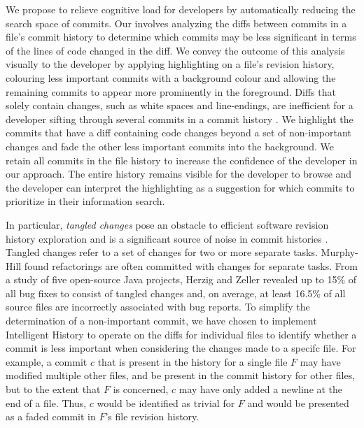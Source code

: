 We propose  to relieve cognitive load for developers by automatically reducing the search space of commits.
Our  involves analyzing the diffs between commits in a file's commit history to determine which commits may be less significant in terms of the lines of code changed in the diff.
We convey the outcome of this analysis visually to the developer by applying highlighting on a file's revision history, 
colouring less important commits with a background colour and allowing the remaining commits to appear more prominently in the foreground.
Diffs that solely contain changes, such as white spaces and line-endings, are inefficient for a developer sifting through several commits in a commit history \cite{codoban_software_2015}.
We highlight the commits that have a diff containing code changes beyond a set of non-important changes and fade the other less important commits into the background.
We retain all commits in the file history to increase the confidence of the developer in our approach.
The entire history remains visible for the developer to browse 
and the developer can interpret the highlighting as a suggestion for which commits to prioritize in their information search.

In particular, \emph{tangled changes} pose an obstacle to efficient software revision history exploration 
and is a significant source of noise in commit histories \cite{herzig_tangled_2013}.
Tangled changes refer to a set of changes for two or more separate tasks. 
Murphy-Hill \etal \cite{murphy-hill_refactor_2012} found refactorings are often committed with changes for separate tasks. 
From a study of five open-source Java projects, Herzig and Zeller \cite{herzig_tangled_2013} revealed up to 15\% of all bug fixes to consist of tangled changes and, 
on average, at least 16.5\% of all source files are incorrectly associated with bug reports. 
To simplify the determination of a non-important commit, we have chosen to implement Intelligent History to operate on
the diffs for individual files to identify whether a commit is less important when considering the changes made to a specifc file. 
For example, a commit $c$ that is present in the history for a single file $F$ may have modified multiple other files, 
and be present in the commit history for other files, but to the extent that $F$ is concerned, 
$c$ may have only added a newline at the end of a file.
Thus, $c$ would be identified as trivial for $F$ and would be presented as a faded commit in $F$'s file revision history.


